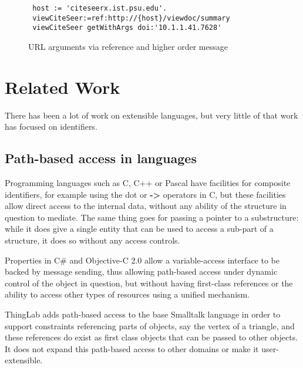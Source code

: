 \documentclass[preprint,authoryear]{acm_proc_article-sp}
\begin{document}
\begin{figure}[htbp]
\begin{center}
\begin{small}
\begin{verbatim}
 host := 'citeseerx.ist.psu.edu'.
 viewCiteSeer:=ref:http://{host}/viewdoc/summary
 viewCiteSeer getWithArgs doi:'10.1.1.41.7628'
\end{verbatim}
\end{small}
\caption{URL arguments via reference and higher order message}
\label{url-args}
\end{center}
\end{figure}




\section{Related Work}

There has been a lot of work on extensible languages, but very little of that work 
has focused on identifiers.  

\subsection{Path-based access in languages}

Programming languages such as C, C++ or Pascal have facilities for composite
identifiers, for example using the dot or {\bf -> } operators in C, but these facilities allow
direct access to the internal data, without any ability of the structure in question to 
mediate.  The same thing goes for passing a pointer to a substructure:  while it
does give a single entity that can be used to access a sub-part of a structure, it
does so without any access controls.

Properties in C\# and Objective-C 2.0 allow a variable-access interface to be backed by 
message sending, thus allowing path-based access under dynamic control of the object
in question, but without having first-class references or the ability to access other
types of resources using a unified mechanism.

ThingLab\cite{thinglab}  adds path-based access to the base Smalltalk language in order to support
constraints referencing parts of objects, say the vertex of a triangle, and these
references do exist as first class objects that can be passed to other objects.
   It does not
expand this path-based access to other domains or make it user-extensible.
\end{document}
